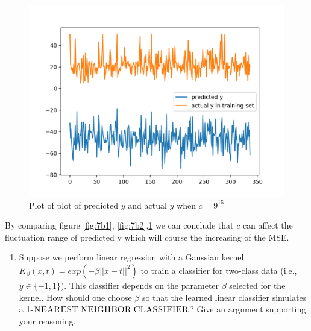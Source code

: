 \documentclass[A4,12pt]{article}
\begin{document}
\begin{enumerate}[6.]
\begin{enumerate}[7.]
\begin{enumerate}[(b)]
    \begin{figure}[!htb]
        \centering \includegraphics[width=0.8\columnwidth]{7b3}
        \caption{
          \label{fig:7b3}
          Plot of plot of predicted $y$ and actual $y$ when $c = 9^{15}$
        }
    \end{figure}
    By comparing figure \ref{fig:7b1}, \ref{fig:7b2},\ref{fig:7b3} we can conclude that $c$ can affect the fluctuation range of predicted y which will course the increasing of the MSE.  
    \end{enumerate}
\end{enumerate}
\clearpage
\begin{enumerate}[8.]
\item Suppose we perform linear regression with a Gaussian kernel $K_\beta(x,t)=exp(-\beta||x-t||^2)$ to train a classifier for two-class data (i.e., $y\in \{-1,1\})$. This classifier depends on the parameter $\beta$ selected for the kernel. How should one choose $\beta$ so that the learned linear classifier simulates a 1-$\textsc{NEAREST}\; \textsc{NEIGHBOR}\; \textsc{CLASSIFIER}$? Give an argument supporting your reasoning. \\


\end{enumerate}
\end{enumerate}
\end{document}
